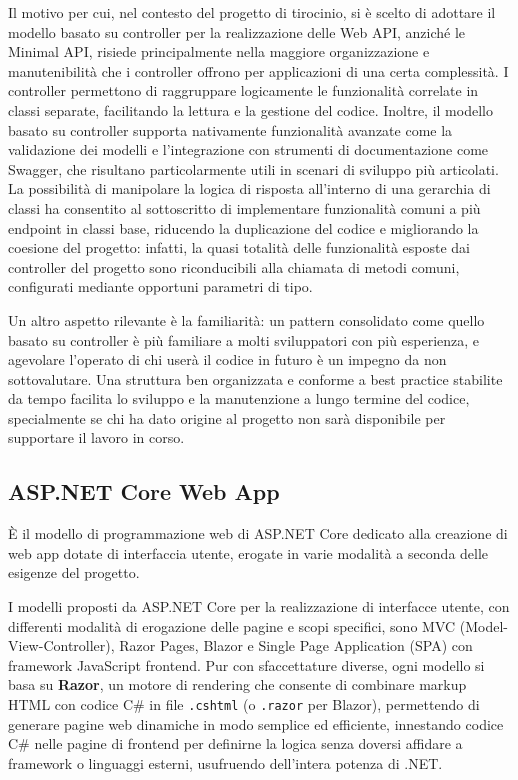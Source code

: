 Il motivo per cui, nel contesto del progetto di tirocinio, si è scelto di adottare il modello basato su controller per la realizzazione delle Web API, anziché le Minimal API, risiede principalmente nella maggiore organizzazione e manutenibilità che i controller offrono per applicazioni di una certa complessità. I controller permettono di raggruppare logicamente le funzionalità correlate in classi separate, facilitando la lettura e la gestione del codice. Inoltre, il modello basato su controller supporta nativamente funzionalità avanzate come la validazione dei modelli e l'integrazione con strumenti di documentazione come Swagger, che risultano particolarmente utili in scenari di sviluppo più articolati. La possibilità di manipolare la logica di risposta all'interno di una gerarchia di classi ha consentito al sottoscritto di implementare funzionalità comuni a più endpoint in classi base, riducendo la duplicazione del codice e migliorando la coesione del progetto: infatti, la quasi totalità delle funzionalità esposte dai controller del progetto sono riconducibili alla chiamata di metodi comuni, configurati mediante opportuni parametri di tipo.

Un altro aspetto rilevante è la familiarità: un pattern consolidato come quello basato su controller è più familiare a molti sviluppatori con più esperienza, e agevolare l'operato di chi userà il codice in futuro è un impegno da non sottovalutare. Una struttura ben organizzata e conforme a best practice stabilite da tempo facilita lo sviluppo e la manutenzione a lungo termine del codice, specialmente se chi ha dato origine al progetto non sarà disponibile per supportare il lavoro in corso.

\subsection{ASP.NET Core Web App}
È il modello di programmazione web di ASP.NET Core dedicato alla creazione di web app dotate di interfaccia utente, erogate in varie modalità a seconda delle esigenze del progetto.

I modelli proposti da ASP.NET Core per la realizzazione di interfacce utente, con differenti modalità di erogazione delle pagine e scopi specifici, sono MVC (Model-View-Controller), Razor Pages, Blazor e Single Page Application (SPA) con framework JavaScript frontend.
Pur con sfaccettature diverse, ogni modello si basa su \textbf{Razor}, un motore di rendering che consente di combinare markup HTML con codice C\# in file \texttt{.cshtml} (o \texttt{.razor} per Blazor), permettendo di generare pagine web dinamiche in modo semplice ed efficiente, innestando codice C\# nelle pagine di frontend per definirne la logica senza doversi affidare a framework o linguaggi esterni, usufruendo dell'intera potenza di .NET.


